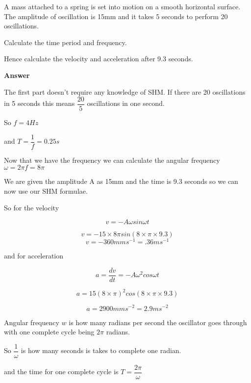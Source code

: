 \documentclass[revision-guide.tex]{subfiles}
\begin{document}
\begin{example}


A mass attached to a spring is set into motion on a smooth horizontal surface. The amplitude of oscillation is 15mm and it takes 5 seconds to perform 20 oscillations.

Calculate the time period and frequency.

Hence calculate the velocity and acceleration after 9.3 seconds.

	\vspace{1cm}

\textbf{Answer}

The first part doesn't require any knowledge of SHM. If there are 20 oscillations in 5 seconds this means $\dfrac{20}{5}$ oscillations in one second.

So $f=4Hz$

and $T = \dfrac{1}{f} = 0.25s$

Now that we have the frequency we can calculate the angular frequency $\omega = 2 \pi f = 8 \pi$

We are given the amplitude A as 15mm and the time is 9.3 seconds so we can now use our SHM formulae.

So for the velocity

\[
v=-A \omega sin \omega t
\]

\[
v = -15 \times 8 \pi sin (8 \times \pi \times 9.3)
\]
\[
v = -360 mms^{-1} = .36ms^{-1}
\]

and for acceleration

\[
a = \dfrac{dv}{dt}= -A \omega^2 cos \omega t
\]

\[
a = 15 (8 \times \pi)^2 cos (8 \times \pi \times 9.3)
\]

\[
a = 2900 mms^{-2} = 2.9ms^{-2}
\]


\end{example}




Angular frequency $w$ is how many radians per second the oscillator goes through with one complete cycle being $2 \pi$ radians.

So $\dfrac{1}{\omega}$ is how many seconds is takes to complete one radian.

and the time for one complete cycle is $T = \dfrac{2 \pi}{\omega}$

\end{document}

